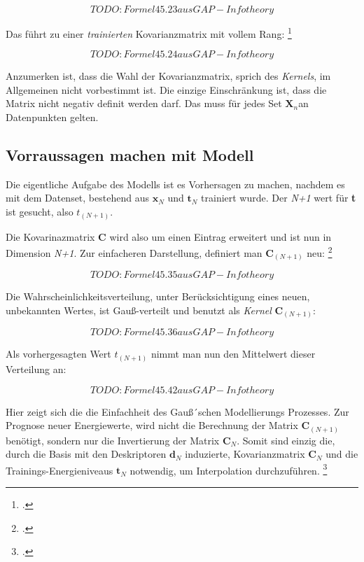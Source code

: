 $$TODO: Formel 45.23 aus GAP-Info theory$$


Das führt zu einer \textit{trainierten} Kovarianzmatrix mit vollem Rang: \footcite[540]{GAP-info-theory}


$$TODO: Formel 45.24 aus GAP-Info theory$$

Anzumerken ist, dass die Wahl der Kovarianzmatrix, sprich des \textit{Kernels}, im Allgemeinen nicht vorbestimmt ist. Die einzige Einschränkung ist, dass die Matrix nicht negativ definit werden darf. Das muss für jedes Set  $\textbf{X}_n$an Datenpunkten gelten. 





\subsection{Vorraussagen machen mit Modell}

Die eigentliche Aufgabe des Modells ist es Vorhersagen zu machen, nachdem es mit dem Datenset, bestehend aus $\textbf{x}_N$ und $\textbf{t}_N$ trainiert wurde. Der \textit{N+1} wert für \textbf{t} ist gesucht, also $t_(N+1)$. 

Die Kovarinazmatrix \textbf{C} wird also um einen Eintrag erweitert und ist nun in Dimension \textit{N+1}. Zur einfacheren Darstellung, definiert man $\textbf{C}_(N+1)$ neu: \footcite[543]{GAP-info-theory}


$$TODO: Formel 45.35 aus GAP-Info theory$$


Die Wahrscheinlichkeitsverteilung, unter Berücksichtigung eines neuen, unbekannten Wertes, ist Gauß-verteilt und benutzt als \textit{Kernel} $\textbf{C}_(N+1)$: 

$$TODO: Formel 45.36 aus GAP-Info theory$$


Als vorhergesagten Wert $\textit{t}_(N+1)$ nimmt man nun den Mittelwert dieser Verteilung an: 


$$TODO: Formel 45.42 aus GAP-Info theory$$

Hier zeigt sich die die Einfachheit des Gauß´schen Modellierungs Prozesses. Zur Prognose neuer Energiewerte, wird nicht die Berechnung der Matrix $\textbf{C}_(N+1)$ benötigt, sondern nur die Invertierung der Matrix $\textbf{C}_N$. Somit sind einzig die, durch die Basis mit den Deskriptoren $\textbf{d}_N$ induzierte, Kovarianzmatrix  $\textbf{C}_N$ und die Trainings-Energieniveaus $\textbf{t}_N$ notwendig, um Interpolation durchzuführen.  \footcite[1052]{GAP-intro}





